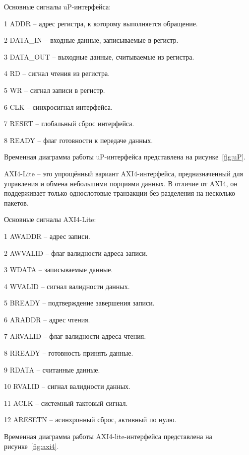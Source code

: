 Основные сигналы uP-интерфейса:

  1 {ADDR} – адрес регистра, к которому выполняется обращение.

  2 {DATA\_IN} – входные данные, записываемые в регистр.

  3 {DATA\_OUT} – выходные данные, считываемые из регистра.

  4 {RD} – сигнал чтения из регистра.

  5 {WR} – сигнал записи в регистр.

  6 {CLK} – синхросигнал интерфейса.

  7 {RESET} – глобальный сброс интерфейса.

  8 {READY} – флаг готовности к передаче данных.

  Временная диаграмма работы uP-интерфейса представлена на 
рисунке~\ref{fig:uP}.



  AXI4-Lite – это упрощённый вариант AXI4-интерфейса, предназначенный для 
управления и обмена небольшими порциями данных. В отличие от AXI4, он 
поддерживает только однослотовые транзакции без разделения на несколько 
пакетов\cite{vivado_axi}.

Основные сигналы AXI4-Lite:

    1 {AWADDR} – адрес записи.

    2 {AWVALID} – флаг валидности адреса записи.

    3 {WDATA} – записываемые данные.

    4 {WVALID} – сигнал валидности данных.

    5 {BREADY} – подтверждение завершения записи.

    6 {ARADDR} – адрес чтения.

    7 {ARVALID} – флаг валидности адреса чтения.

    8 {RREADY} – готовность принять данные.

    9 {RDATA} – считанные данные.

    10 {RVALID} – сигнал валидности данных.

    11 {ACLK} – системный тактовый сигнал.

    12 {ARESETN} – асинхронный сброс, активный по нулю.


  Временная диаграмма работы AXI4-lite-интерфейса представлена на 
рисунке~\ref{fig:axi4}.
    

